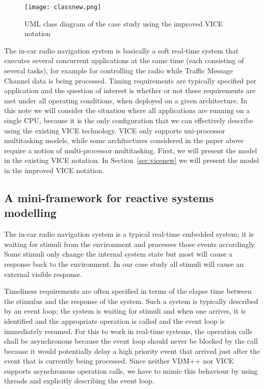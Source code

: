 \begin{figure}[!htb]
\begin{centering}
\texttt{[image: classnew.png]}
\caption{UML class diagram of the case study using the improved VICE notation}
\label{fig:uml2}
\end{centering}
\end{figure}

The in-car radio navigation system is basically a soft real-time system that
executes several concurrent applications at the same time (each consisting
of several tasks), for example for controlling the radio while Traffic Message
Channel data is being processed. Timing requirements are typically specified
per application and the question of interest is whether or not these
requirements are met under all operating conditions, when deployed on
a given architecture. In this note we will consider the situation where all
applications are running on a single CPU, because it is the only configuration
that we can effectively describe using the existing VICE technology. VICE only
supports uni-processor multitasking models, while some architectures considered
in the paper above require a notion of multi-processor multitasking. First, we
will present the model in the existing VICE notation.
In Section~\ref{sec:vicenew} we will present the model
in the improved VICE notation.

\subsection{A mini-framework for reactive systems modelling}

The in-car radio navigation system is a typical real-time embedded system;
it is waiting for stimuli from the environment and processes those events
accordingly. Some stimuli only change the internal system state but most
will cause a response back to the environment. In our case study all
stimuli will cause an external visible response.

Timeliness requirements are often specified in terms of the elapse time
between the stimulus and the response of the system. Such a system is
typically described by an event loop; the system is waiting for stimuli
and when one arrives, it is identified and the appropriate operation is
called and the event loop is immediately resumed. For this to work in
real-time systems, the operation calls shall be asynchronous because
the event loop should never be blocked by the call because it would
potentially delay a high priority event that arrived just after the
event that is currently being processed. Since neither VDM++ nor
VICE supports asynchronous operation calls, we have to mimic this
behaviour by using threads and explicitly describing the event loop.

